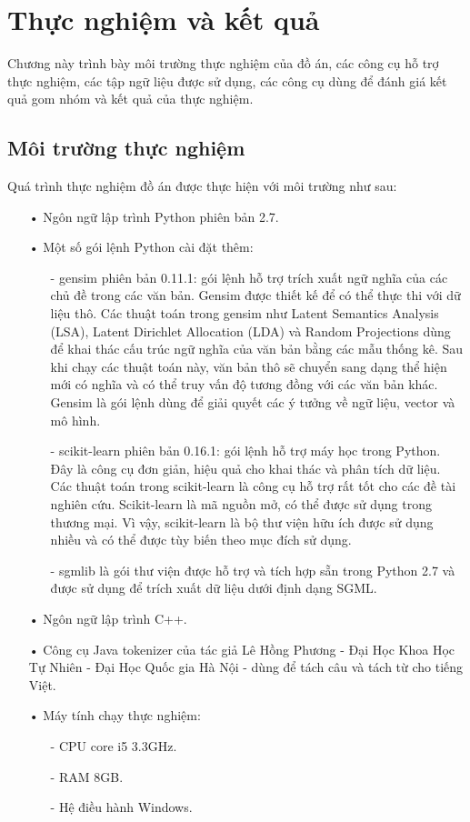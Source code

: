 \chapter{Thực nghiệm và kết quả}
\label{Chapter4}
Chương này trình bày môi trường thực nghiệm của đồ án, các công cụ hỗ trợ thực nghiệm, các tập ngữ liệu được sử dụng, các công cụ dùng để đánh giá kết quả gom nhóm và kết quả của thực nghiệm.

\section{Môi trường thực nghiệm}
Quá trình thực nghiệm đồ án được thực hiện với môi trường như sau:
\begin{enumerate}
\item[•]Ngôn ngữ lập trình Python phiên bản 2.7.
\item[•]Một số gói lệnh Python cài đặt thêm:
\begin{enumerate}
\item[-] gensim phiên bản 0.11.1: gói lệnh hỗ trợ trích xuất ngữ nghĩa của các chủ đề trong các văn bản.
Gensim được thiết kế để có thể thực thi với dữ liệu thô.
Các thuật toán trong gensim như Latent Semantics Analysis (LSA), Latent Dirichlet Allocation (LDA) và Random Projections dùng để khai thác cấu trúc ngữ nghĩa của văn bản bằng các mẫu thống kê.
Sau khi chạy các thuật toán này, văn bản thô sẽ chuyển sang dạng thể hiện mới có nghĩa và có thể truy vấn độ tương đồng với các văn bản khác.
Gensim là gói lệnh dùng để giải quyết các ý tưởng về ngữ liệu, vector và mô hình.
\item[-] scikit-learn phiên bản 0.16.1: gói lệnh hỗ trợ máy học trong Python.
Đây là công cụ đơn giản, hiệu quả cho khai thác và phân tích dữ liệu.
Các thuật toán trong scikit-learn là công cụ hỗ trợ rất tốt cho các đề tài nghiên cứu.
Scikit-learn là mã nguồn mở, có thể được sử dụng trong thương mại.
Vì vậy, scikit-learn là bộ thư viện hữu ích được sử dụng nhiều và có thể được tùy biến theo mục đích sử dụng.
\item[-] sgmlib là gói thư viện được hỗ trợ và tích hợp sẵn trong Python 2.7 và được sử dụng để trích xuất dữ liệu dưới định dạng SGML.
\end{enumerate}
\item[•]Ngôn ngữ lập trình C++.
\item[•]Công cụ Java tokenizer của tác giả Lê Hồng Phương - Đại Học Khoa Học Tự Nhiên - Đại Học Quốc gia Hà Nội - dùng để tách câu và tách từ cho tiếng Việt.
\item[•]Máy tính chạy thực nghiệm:
\begin{enumerate}
\item[-]CPU core i5 3.3GHz.
\item[-]RAM 8GB.
\item[-]Hệ điều hành Windows.
\end{enumerate}
\end{enumerate}

